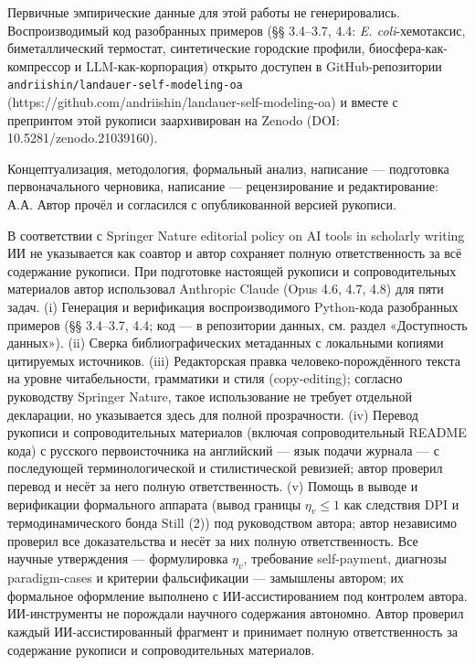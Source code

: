 \documentclass[pdflatex,sn-mathphys-ay]{sn-jnl}
\begin{document}
Первичные эмпирические данные для этой работы не генерировались. Воспроизводимый код разобранных примеров (§§ 3.4--3.7, 4.4: \emph{E. coli}-хемотаксис, биметаллический термостат, синтетические городские профили, биосфера-как-компрессор и LLM-как-корпорация) открыто доступен в GitHub-репозитории \texttt{andriishin/landauer-self-modeling-oa} (https://github.com/andriishin/landauer-self-modeling-oa) и вместе с препринтом этой рукописи заархивирован на Zenodo (DOI: 10.5281/zenodo.21039160).

Концептуализация, методология, формальный анализ, написание --- подготовка первоначального черновика, написание --- рецензирование и редактирование: А.А. Автор прочёл и согласился с опубликованной версией рукописи.

В соответствии с Springer Nature editorial policy on AI tools in scholarly writing ИИ не указывается как соавтор и автор сохраняет полную ответственность за всё содержание рукописи. При подготовке настоящей рукописи и сопроводительных материалов автор использовал Anthropic Claude (Opus 4.6, 4.7, 4.8) для пяти задач. (i) Генерация и верификация воспроизводимого Python-кода разобранных примеров (§§ 3.4--3.7, 4.4; код --- в репозитории данных, см. раздел «Доступность данных»). (ii) Сверка библиографических метаданных с локальными копиями цитируемых источников. (iii) Редакторская правка человеко-порождённого текста на уровне читабельности, грамматики и стиля (copy-editing); согласно руководству Springer Nature, такое использование не требует отдельной декларации, но указывается здесь для полной прозрачности. (iv) Перевод рукописи и сопроводительных материалов (включая сопроводительный README кода) с русского первоисточника на английский --- язык подачи журнала --- с последующей терминологической и стилистической ревизией; автор проверил перевод и несёт за него полную ответственность. (v) Помощь в выводе и верификации формального аппарата (вывод границы \(\eta_v \le 1\) как следствия DPI и термодинамического бонда Still (2)) под руководством автора; автор независимо проверил все доказательства и несёт за них полную ответственность. Все научные утверждения --- формулировка \(\eta_v\), требование self-payment, диагнозы paradigm-cases и критерии фальсификации --- замышлены автором; их формальное оформление выполнено с ИИ-ассистированием под контролем автора. ИИ-инструменты не порождали научного содержания автономно. Автор проверил каждый ИИ-ассистированный фрагмент и принимает полную ответственность за содержание рукописи и сопроводительных материалов.


\nocite{*}

\end{document}
